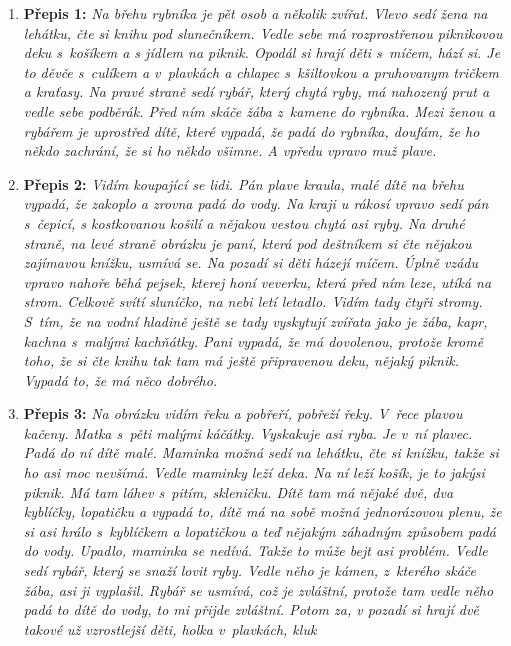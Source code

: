 \begin{enumerate}
	\item \textbf{Přepis 1:} \emph{Na břehu rybníka je pět osob a několik zvířat. Vlevo sedí žena na lehátku, čte si knihu
		      pod slunečníkem. Vedle sebe má rozprostřenou piknikovou deku s košíkem a s jídlem
		      na piknik. Opodál si hrají děti s míčem, hází si. Je to děvče s culíkem a v plavkách a
		      chlapec s kšiltovkou a pruhovanym tričkem a kraťasy. Na pravé straně sedí rybář,
		      který chytá ryby, má nahozený prut a vedle sebe podběrák. Před ním skáče žába
		      z kamene do rybníka. Mezi ženou a rybářem je uprostřed dítě, které vypadá, že padá
		      do rybníka, doufám, že ho někdo zachrání, že si ho někdo všimne. A vpředu vpravo
		      muž plave.}
	\item \textbf{Přepis 2:} \emph{Vidím koupající se lidi. Pán plave kraula, malé dítě na břehu vypadá, že zakoplo a
		      zrovna padá do vody. Na kraji u rákosí vpravo sedí pán s čepicí, s kostkovanou košilí a
		      nějakou vestou chytá asi ryby. Na druhé straně, na levé straně obrázku je paní, která
		      pod deštníkem si čte nějakou zajímavou knížku, usmívá se. Na pozadí si děti házejí
		      míčem. Úplně vzádu vpravo nahoře běhá pejsek, kterej honí veverku, která před ním
		      leze, utíká na strom. Celkově svítí sluníčko, na nebi letí letadlo. Vidím tady čtyři stromy.
		      S tím, že na vodní hladině ještě se tady vyskytují zvířata jako je žába, kapr, kachna
		      s malými kachňátky. Pani vypadá, že má dovolenou, protože kromě toho, že si čte
		      knihu tak tam má ještě připravenou deku, nějaký piknik. Vypadá to, že má něco
		      dobrého.}
	\item \textbf{Přepis 3:} \emph{Na obrázku vidím řeku a pobřeří, pobřeží řeky. V řece plavou kačeny. Matka s pěti
		      malými káčátky. Vyskakuje asi ryba. Je v ní plavec. Padá do ní dítě malé. Maminka
		      možná sedí na lehátku, čte si knížku, takže si ho asi moc nevšímá. Vedle maminky leží
		      deka. Na ní leží košík, je to jakýsi piknik. Má tam láhev s pitím, skleničku. Dítě tam má
		      nějaké dvě, dva kyblíčky, lopatičku a vypadá to, dítě má na sobě možná jednorázovou
		      plenu, že si asi hrálo s kyblíčkem a lopatičkou a teď nějakým záhadným způsobem
		      padá do vody. Upadlo, maminka se nedívá. Takže to může bejt asi problém. Vedle
		      sedí rybář, který se snaží lovit ryby. Vedle něho je kámen, z kterého skáče žába, asi ji
		      vyplašil. Rybář se usmívá, což je zvláštní, protože tam vedle něho padá to dítě do
		      vody, to mi přijde zvláštní. Potom za, v pozadí si hrají dvě takové už vzrostlejší děti, holka v plavkách, kluk
}
\end{enumerate}
